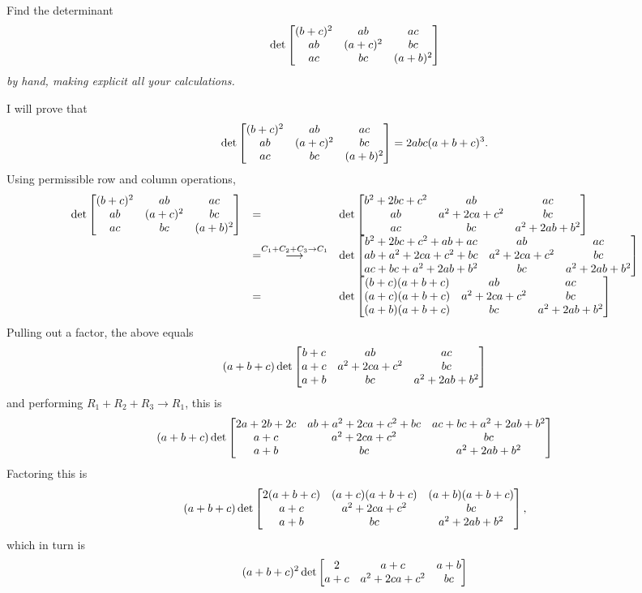\begin{pro}
Find the determinant
$$\det \begin{bmatrix}  (b+c)^2 &  ab & ac \cr
ab & (a+c)^2 & bc\cr ac & bc & (a+b)^2 \cr
\end{bmatrix}  $$
{\em by hand, making explicit all your calculations.}
\begin{answer}
I will prove that
$$\det \begin{bmatrix}  (b+c)^2 &  ab & ac \cr
ab & (a+c)^2 & bc\cr ac & bc & (a+b)^2 \cr
\end{bmatrix} = 2abc(a+b+c)^3. $$
Using permissible row and column operations,
$$\begin{array}{lll}
\det \begin{bmatrix}  (b+c)^2 &  ab & ac \cr ab & (a+c)^2 & bc\cr ac
& bc & (a+b)^2 \cr
\end{bmatrix} & = & \det \begin{bmatrix}  b^2+2bc+c^2 &  ab & ac \cr ab & a^2+2ca+c^2 & bc\cr ac
& bc & a^2+2ab+b^2 \cr
\end{bmatrix}\\
& = \grstep{C_1+C_2+C_3\to C_1} & \det
\begin{bmatrix} b^2+2bc+c^2+ab+ac & ab & ac \cr ab+a^2+2ca+c^2+bc & a^2+2ca+c^2 & bc\cr
ac+bc+a^2+2ab+b^2 & bc & a^2+2ab+b^2 \cr
\end{bmatrix}\\
& =  & \det
\begin{bmatrix} (b+c)(a+b+c) & ab & ac \cr (a+c)(a+b+c) & a^2+2ca+c^2 & bc\cr
(a+b)(a+b+c) & bc & a^2+2ab+b^2 \cr
\end{bmatrix}\\
\end{array}$$
Pulling out a factor, the above equals
$$
 (a+b+c)\det
\begin{bmatrix} b+c & ab & ac \cr a+c & a^2+2ca+c^2 & bc\cr
a+b & bc & a^2+2ab+b^2 \cr
\end{bmatrix}
$$ and performing $R_1+R_2+R_3\to R_1$, this is  $$ (a+b+c)\det
\begin{bmatrix} 2a+2b+2c & ab+a^2+2ca+c^2+bc & ac+bc+ a^2+2ab+b^2 \cr a+c & a^2+2ca+c^2 & bc\cr
a+b & bc & a^2+2ab+b^2 \cr
\end{bmatrix}$$
Factoring this is
$$ (a+b+c)\det
\begin{bmatrix} 2(a+b+c) & (a+c)(a+b+c) & (a+b)(a+b+c) \cr a+c & a^2+2ca+c^2 & bc\cr
a+b & bc & a^2+2ab+b^2 \cr
\end{bmatrix},$$which in turn is  $$(a+b+c)^2\det
\begin{bmatrix} 2 & a+c & a+b \cr a+c & a^2+2ca+c^2 & bc\cr

\end{bmatrix}$$
\end{answer}
\end{pro}
